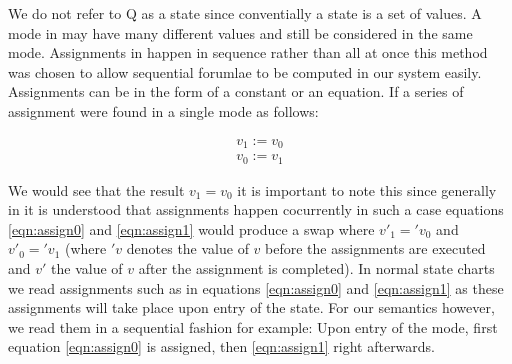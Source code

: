 We do not refer to Q as a state since conventially a state is a set of values. A mode in \plcchart may have many different values and still be considered in the same mode. Assignments in \plccharts happen in sequence rather than all at once this method was chosen to allow sequential forumlae to be computed in our system easily. Assignments can be in the form of a constant or an equation. If a series of assignment were found in a single mode as follows:

\begin{align}
v_1 := v_0 \label{eqn:assign0} \\ 
v_0 := v_1 \label{eqn:assign1}
\end{align}

We would see that the result $v_1 = v_0$ it is important to note this since generally in \cite{StateChartVis}  it is understood that assignments happen cocurrently in such a case equations \ref{eqn:assign0} and \ref{eqn:assign1} would produce a swap where $v'_1 = 'v_0$ and $v'_0 = 'v_1$ (where $'v$ denotes the value of $v$ before the assignments are executed and $v'$ the value of $v$ after the assignment is completed). In normal state charts we read assignments such as in equations \ref{eqn:assign0} and \ref{eqn:assign1} as these assignments will take place upon entry of the state. For our semantics however, we read them in a sequential fashion for example: Upon entry of the mode, first equation \ref{eqn:assign0} is assigned, then \ref{eqn:assign1} right afterwards.

